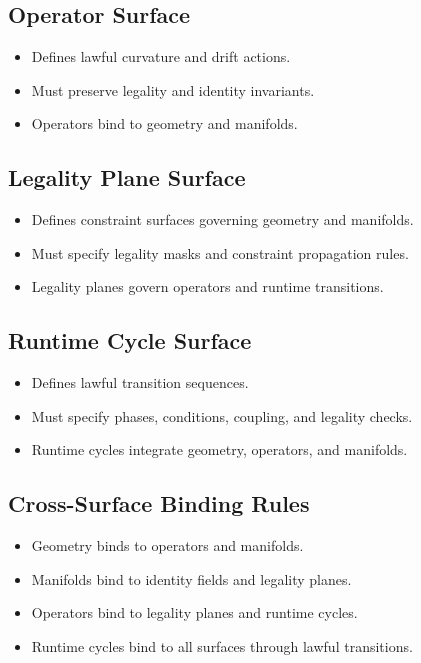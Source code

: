 \subsection{Operator Surface}
\begin{itemize}
    \item Defines lawful curvature and drift actions.
    \item Must preserve legality and identity invariants.
    \item Operators bind to geometry and manifolds.
\end{itemize}

\subsection{Legality Plane Surface}
\begin{itemize}
    \item Defines constraint surfaces governing geometry and manifolds.
    \item Must specify legality masks and constraint propagation rules.
    \item Legality planes govern operators and runtime transitions.
\end{itemize}

\subsection{Runtime Cycle Surface}
\begin{itemize}
    \item Defines lawful transition sequences.
    \item Must specify phases, conditions, coupling, and legality checks.
    \item Runtime cycles integrate geometry, operators, and manifolds.
\end{itemize}

\subsection{Cross-Surface Binding Rules}
\begin{itemize}
    \item Geometry binds to operators and manifolds.
    \item Manifolds bind to identity fields and legality planes.
    \item Operators bind to legality planes and runtime cycles.
    \item Runtime cycles bind to all surfaces through lawful transitions.
\end{itemize}

